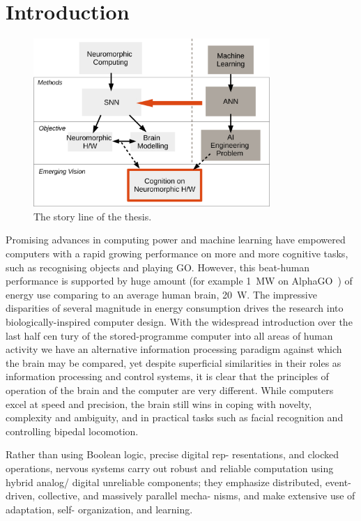 \chapter{Introduction}
\label{cha:intro}

\begin{figure}[thb!]
	\centering
	\includegraphics[width=0.8\textwidth]{pics_intro/intro1.pdf}
	\caption{The story line of the thesis.}
	\label{fig:intro}
\end{figure}

Promising advances in computing power and machine learning have empowered computers with a rapid growing performance on more and more cognitive tasks, such as recognising objects and playing GO. However, this beat-human performance is supported by huge amount (for example 1~MW on AlphaGO~\cite{silver2016mastering}) of energy use comparing to an average human brain, 20~W.
The impressive disparities of several magnitude in energy consumption drives the research into biologically-inspired computer design.
With the widespread introduction over the last half cen
tury of the stored-programme computer into all areas of
human activity we have an alternative information processing
paradigm against which the brain may be compared, yet
despite superficial similarities in their roles as information
processing and control systems, it is clear that the principles
of operation of the brain and the computer are very different.
While computers excel at speed and precision, the brain still
wins in coping with novelty, complexity and ambiguity, and
in practical tasks such as facial recognition and controlling
bipedal locomotion.

Rather than using Boolean logic, precise digital rep-
resentations, and clocked operations, nervous systems carry
out robust and reliable computation using hybrid analog/
digital unreliable components; they emphasize distributed,
event-driven, collective, and massively parallel mecha-
nisms, and make extensive use of adaptation, self-
organization, and learning.

